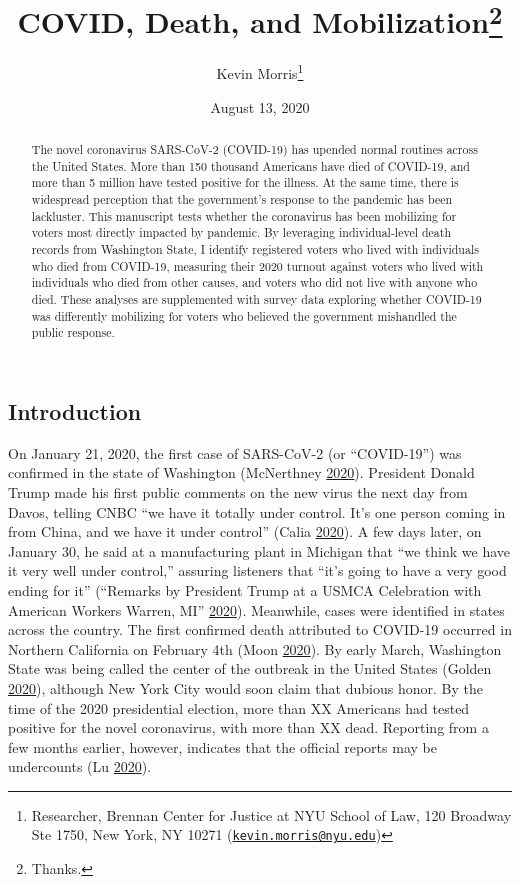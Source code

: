 \documentclass[
  12pt,
]{article}
\title{COVID, Death, and Mobilization\thanks{Thanks.}}
\author{Kevin Morris\footnote{Researcher, Brennan Center for Justice at NYU School of Law, 120 Broadway Ste 1750, New York, NY 10271 (\href{mailto:kevin.morris@nyu.edu}{\nolinkurl{kevin.morris@nyu.edu}})}}
\date{August 13, 2020}
\begin{document}
\maketitle
\begin{abstract}
The novel coronavirus SARS-CoV-2 (COVID-19) has upended normal routines across the United States. More than 150 thousand Americans have died of COVID-19, and more than 5 million have tested positive for the illness. At the same time, there is widespread perception that the government's response to the pandemic has been lackluster. This manuscript tests whether the coronavirus has been mobilizing for voters most directly impacted by pandemic. By leveraging individual-level death records from Washington State, I identify registered voters who lived with individuals who died from COVID-19, measuring their 2020 turnout against voters who lived with individuals who died from other causes, and voters who did not live with anyone who died. These analyses are supplemented with survey data exploring whether COVID-19 was differently mobilizing for voters who believed the government mishandled the public response.
\end{abstract}

\pagebreak

\doublespacing

\hypertarget{introduction}{%
\subsection*{Introduction}\label{introduction}}

On January 21, 2020, the first case of SARS-CoV-2 (or ``COVID-19'') was confirmed in the state of Washington (McNerthney \protect\hyperlink{ref-McNerthney2020}{2020}). President Donald Trump made his first public comments on the new virus the next day from Davos, telling CNBC ``we have it totally under control. It's one person coming in from China, and we have it under control'' (Calia \protect\hyperlink{ref-Calia2020}{2020}). A few days later, on January 30, he said at a manufacturing plant in Michigan that ``we think we have it very well under control,'' assuring listeners that ``it's going to have a very good ending for it'' (``Remarks by President Trump at a USMCA Celebration with American Workers \textbar{} Warren, MI'' \protect\hyperlink{ref-whitehouse2020}{2020}). Meanwhile, cases were identified in states across the country. The first confirmed death attributed to COVID-19 occurred in Northern California on February 4th (Moon \protect\hyperlink{ref-Moon2020}{2020}). By early March, Washington State was being called the center of the outbreak in the United States (Golden \protect\hyperlink{ref-Golden2020}{2020}), although New York City would soon claim that dubious honor. By the time of the 2020 presidential election, more than XX Americans had tested positive for the novel coronavirus, with more than XX dead. Reporting from a few months earlier, however, indicates that the official reports may be undercounts (Lu \protect\hyperlink{ref-Lu2020}{2020}).
\end{document}
